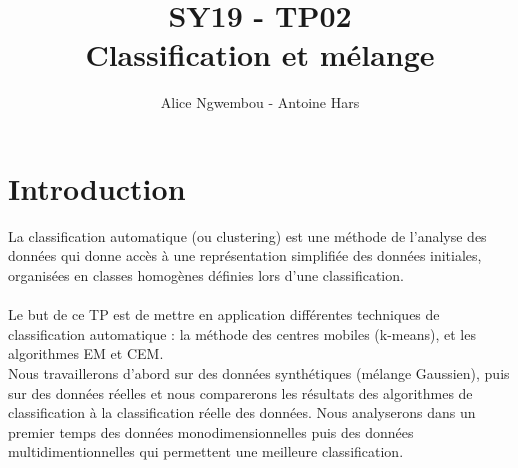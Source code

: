 \documentclass[a4paper, 10pt]{article}
\title{SY19 - TP02\\Classification et mélange}
\author{Alice Ngwembou - Antoine Hars}
\begin{document}
\maketitle

\section*{Introduction}

La classification automatique (ou clustering) est une méthode de l'analyse des données qui donne accès
à une représentation simplifiée des données initiales, organisées en classes homogènes définies lors d'une classification.\\ \\
Le but de ce TP est de mettre en application différentes techniques de classification automatique :
la méthode des centres mobiles (k-means), et les algorithmes EM et CEM.\\
Nous travaillerons d'abord sur des données synthétiques (mélange Gaussien),
puis sur des données réelles et nous comparerons les résultats des algorithmes de classification à la classification réelle des données.
Nous analyserons dans un premier temps des données monodimensionnelles puis des données multidimentionnelles qui permettent
une meilleure classification.
\end{document}
